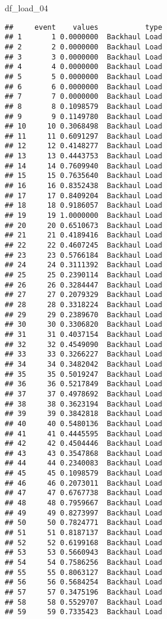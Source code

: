 \documentclass[
]{article}
\newenvironment{Shaded}{\begin{snugshade}}{\end{snugshade}}
\newcommand{\NormalTok}[1]{#1}
\begin{document}
\begin{Shaded}
\begin{Highlighting}[]
\NormalTok{df\_load\_04}
\end{Highlighting}
\end{Shaded}

\begin{verbatim}
##     event    values           type
## 1       1 0.0000000  Backhaul Load
## 2       2 0.0000000  Backhaul Load
## 3       3 0.0000000  Backhaul Load
## 4       4 0.0000000  Backhaul Load
## 5       5 0.0000000  Backhaul Load
## 6       6 0.0000000  Backhaul Load
## 7       7 0.0000000  Backhaul Load
## 8       8 0.1098579  Backhaul Load
## 9       9 0.1149780  Backhaul Load
## 10     10 0.3068498  Backhaul Load
## 11     11 0.6091297  Backhaul Load
## 12     12 0.4148277  Backhaul Load
## 13     13 0.4443753  Backhaul Load
## 14     14 0.7609940  Backhaul Load
## 15     15 0.7635640  Backhaul Load
## 16     16 0.8352438  Backhaul Load
## 17     17 0.8409204  Backhaul Load
## 18     18 0.9186057  Backhaul Load
## 19     19 1.0000000  Backhaul Load
## 20     20 0.6510673  Backhaul Load
## 21     21 0.4189416  Backhaul Load
## 22     22 0.4607245  Backhaul Load
## 23     23 0.5766184  Backhaul Load
## 24     24 0.3111392  Backhaul Load
## 25     25 0.2390114  Backhaul Load
## 26     26 0.3284447  Backhaul Load
## 27     27 0.2079329  Backhaul Load
## 28     28 0.3318224  Backhaul Load
## 29     29 0.2389670  Backhaul Load
## 30     30 0.3306820  Backhaul Load
## 31     31 0.4037154  Backhaul Load
## 32     32 0.4549090  Backhaul Load
## 33     33 0.3266227  Backhaul Load
## 34     34 0.3482042  Backhaul Load
## 35     35 0.5019247  Backhaul Load
## 36     36 0.5217849  Backhaul Load
## 37     37 0.4978692  Backhaul Load
## 38     38 0.3623194  Backhaul Load
## 39     39 0.3842818  Backhaul Load
## 40     40 0.5480136  Backhaul Load
## 41     41 0.4445595  Backhaul Load
## 42     42 0.4504446  Backhaul Load
## 43     43 0.3547868  Backhaul Load
## 44     44 0.2340083  Backhaul Load
## 45     45 0.1098579  Backhaul Load
## 46     46 0.2073011  Backhaul Load
## 47     47 0.6767738  Backhaul Load
## 48     48 0.7959667  Backhaul Load
## 49     49 0.8273997  Backhaul Load
## 50     50 0.7824771  Backhaul Load
## 51     51 0.8187137  Backhaul Load
## 52     52 0.6199168  Backhaul Load
## 53     53 0.5660943  Backhaul Load
## 54     54 0.7586256  Backhaul Load
## 55     55 0.8063127  Backhaul Load
## 56     56 0.5684254  Backhaul Load
## 57     57 0.3475196  Backhaul Load
## 58     58 0.5529707  Backhaul Load
## 59     59 0.7335423  Backhaul Load

\end{verbatim}
\end{document}
